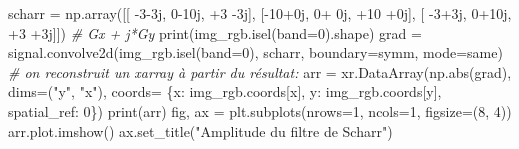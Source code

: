 \documentclass[
]{article}
\newenvironment{Shaded}{}{}
\newcommand{\BuiltInTok}[1]{\textcolor[rgb]{0.00,0.50,0.00}{#1}}
\newcommand{\CommentTok}[1]{\textcolor[rgb]{0.38,0.63,0.69}{\textit{#1}}}
\newcommand{\DecValTok}[1]{\textcolor[rgb]{0.25,0.63,0.44}{#1}}
\newcommand{\NormalTok}[1]{#1}
\newcommand{\OperatorTok}[1]{\textcolor[rgb]{0.40,0.40,0.40}{#1}}
\newcommand{\OtherTok}[1]{\textcolor[rgb]{0.00,0.44,0.13}{#1}}
\newcommand{\StringTok}[1]{\textcolor[rgb]{0.25,0.44,0.63}{#1}}
\begin{document}
\label{5e28dea3}
\label{cb16}
\begin{Shaded}
\begin{Highlighting}[]
\NormalTok{scharr }\OperatorTok{=}\NormalTok{ np.array([[ }\OperatorTok{{-}}\DecValTok{3}\OperatorTok{{-}}\OtherTok{3j}\NormalTok{, }\DecValTok{0}\OperatorTok{{-}}\OtherTok{10j}\NormalTok{,  }\OperatorTok{+}\DecValTok{3} \OperatorTok{{-}}\OtherTok{3j}\NormalTok{],}
\NormalTok{                   [}\OperatorTok{{-}}\DecValTok{10}\OperatorTok{+}\OtherTok{0j}\NormalTok{, }\DecValTok{0}\OperatorTok{+} \OtherTok{0j}\NormalTok{, }\OperatorTok{+}\DecValTok{10} \OperatorTok{+}\OtherTok{0j}\NormalTok{],}
\NormalTok{                   [ }\OperatorTok{{-}}\DecValTok{3}\OperatorTok{+}\OtherTok{3j}\NormalTok{, }\DecValTok{0}\OperatorTok{+}\OtherTok{10j}\NormalTok{,  }\OperatorTok{+}\DecValTok{3} \OperatorTok{+}\OtherTok{3j}\NormalTok{]]) }\CommentTok{\# Gx + j*Gy}
\BuiltInTok{print}\NormalTok{(img\_rgb.isel(band}\OperatorTok{=}\DecValTok{0}\NormalTok{).shape)}
\NormalTok{grad }\OperatorTok{=}\NormalTok{ signal.convolve2d(img\_rgb.isel(band}\OperatorTok{=}\DecValTok{0}\NormalTok{), scharr, boundary}\OperatorTok{=}\StringTok{\textquotesingle{}symm\textquotesingle{}}\NormalTok{, mode}\OperatorTok{=}\StringTok{\textquotesingle{}same\textquotesingle{}}\NormalTok{)}
\CommentTok{\# on reconstruit un xarray à partir du résultat:}
\NormalTok{arr }\OperatorTok{=}\NormalTok{ xr.DataArray(np.}\BuiltInTok{abs}\NormalTok{(grad), dims}\OperatorTok{=}\NormalTok{(}\StringTok{"y"}\NormalTok{, }\StringTok{"x"}\NormalTok{), coords}\OperatorTok{=}\NormalTok{ \{}\StringTok{\textquotesingle{}x\textquotesingle{}}\NormalTok{: img\_rgb.coords[}\StringTok{\textquotesingle{}x\textquotesingle{}}\NormalTok{], }\StringTok{\textquotesingle{}y\textquotesingle{}}\NormalTok{: img\_rgb.coords[}\StringTok{\textquotesingle{}y\textquotesingle{}}\NormalTok{], }\StringTok{\textquotesingle{}spatial\_ref\textquotesingle{}}\NormalTok{: }\DecValTok{0}\NormalTok{\})}
\BuiltInTok{print}\NormalTok{(arr)}
\NormalTok{fig, ax }\OperatorTok{=}\NormalTok{ plt.subplots(nrows}\OperatorTok{=}\DecValTok{1}\NormalTok{, ncols}\OperatorTok{=}\DecValTok{1}\NormalTok{, figsize}\OperatorTok{=}\NormalTok{(}\DecValTok{8}\NormalTok{, }\DecValTok{4}\NormalTok{))}
\NormalTok{arr.plot.imshow()}
\NormalTok{ax.set\_title(}\StringTok{"Amplitude du filtre de Scharr"}\NormalTok{)}
\end{Highlighting}
\end{Shaded}
\end{document}
